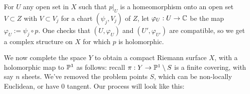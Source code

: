 \documentclass[11pt]{article}
\begin{document}
For $U$ any open set in $X$ such that $p|_U$ is a homeomorphism onto an open set $V \subset Z$ with $V \subset V_j$ for a chart $(\psi_j,V_j)$ of $Z$, let $\varphi_U:U \to \C$ be the map $\varphi_U:=\psi_j \circ p$. One checks that $(U,\varphi_U)$ and $(U',\varphi_{U'})$ are compatible, so we get a complex structure on $X$ for which $p$ is holomorphic.

We now complete the space $Y$ to obtain a compact Riemann surface $X$, with a holomorphic map to $\P^1$ as follows: recall $\pi:Y \to \P^1 \setminus S$ is a finite covering, with say $n$ sheets. We've removed the problem points $S$, which can be non-locally Euclidean, or have 0 tangent. Our process will look like this:

\begin{center}

\begin{tikzpicture}[x=0.75pt,y=0.75pt,yscale=-1,xscale=1]


\end{tikzpicture}
\end{center}
\end{document}
